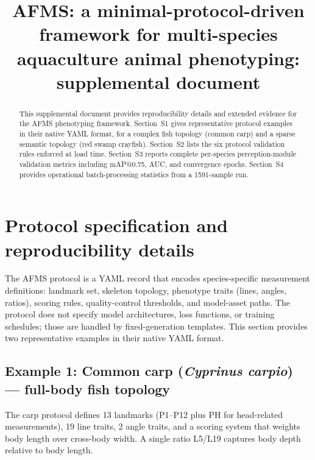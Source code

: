 \documentclass[9pt]{osa-supplemental-document}
\title{AFMS: a minimal-protocol-driven framework for multi-species aquaculture animal phenotyping: supplemental document}
\author{}
\begin{document}
\maketitle

\begin{abstract}
This supplemental document provides reproducibility details and extended evidence for the AFMS phenotyping framework.
Section~S1 gives representative protocol examples in their native YAML format, for a complex fish topology (common carp) and a sparse semantic topology (red swamp crayfish). Section~S2 lists the six protocol validation rules enforced at load time. Section~S3 reports complete per-species perception-module validation metrics including mAP@0.75, AUC, and convergence epochs. Section~S4 provides operational batch-processing statistics from a 1591-sample run.
\end{abstract}

\section{Protocol specification and reproducibility details}
\label{sec:protocol_spec}

The AFMS protocol is a YAML record that encodes species-specific measurement definitions: landmark set, skeleton topology, phenotype traits (lines, angles, ratios), scoring rules, quality-control thresholds, and model-asset paths. The protocol does not specify model architectures, loss functions, or training schedules; those are handled by fixed-generation templates. This section provides two representative examples in their native YAML format.

\subsection{Example 1: Common carp (\textit{Cyprinus carpio}) --- full-body fish topology}

The carp protocol defines 13 landmarks (P1--P12 plus PH for head-related measurements), 19 line traits, 2 angle traits, and a scoring system that weights body length over cross-body width. A single ratio L5/L19 captures body depth relative to body length.
\end{document}
